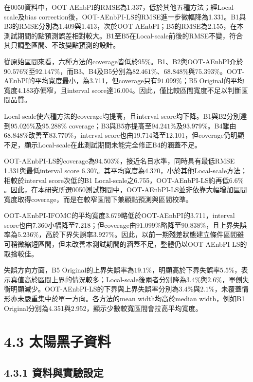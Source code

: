 在0050資料中，OOT-AEnbPI的RMSE為1.337，低於其他五種方法；經Local-scale及bias correction後，OOT-AEnbPI-LS的RMSE進一步微幅降為1.331。B1與B3的RMSE分別為1.409與1.413，次於OOT-AEnbPI；B5的RMSE為2.155，在本測試期間的點預測誤差相對較大。B1至B5在Local-scale前後的RMSE不變，符合其只調整區間、不改變點預測的設計。

從原始區間來看，六種方法的coverage皆低於95\%。B1、B2與OOT-AEnbPI介於$90.576\%$至$92.147\%$，而B3、B4及B5分別為$82.461\%$、$68.848\%$與$75.393\%$。OOT-AEnbPI的平均寬度最小，為3.711，但coverage只有$91.099\%$；B5 Original的平均寬度4.183亦偏窄，且interval score達16.004。因此，僅比較區間寬度不足以判斷區間品質。

Local-scale使六種方法的coverage均提高，且interval score均下降。B1與B2分別達到$95.026\%$及$95.288\%$ coverage；B3與B5亦提高至$94.241\%$及$93.979\%$。B4雖由$68.848\%$改善至$83.770\%$，interval score也由19.714降至12.101，但coverage仍明顯不足，顯示Local-scale在此測試期間未能完全修正B4的涵蓋不足。

OOT-AEnbPI-LS的coverage為$94.503\%$，接近名目水準，同時具有最低RMSE 1.331與最低interval score 6.307。其平均寬度為4.370，小於其他Local-scale方法；相較於interval score次低的B1 Local-scale之6.755，OOT-AEnbPI-LS約再低$6.6\%$。因此，在本研究所選0050測試期間中，OOT-AEnbPI-LS並非依靠大幅增加區間寬度取得coverage，而是在較窄區間下兼顧點預測與區間校準。

OOT-AEnbPI-IFOMC的平均寬度3.679略低於OOT-AEnbPI的3.711，interval score也由7.360小幅降至7.218；但coverage由$91.099\%$略降至$90.838\%$，且上界失誤率為$5.236\%$，高於下界失誤率$3.927\%$。因此，以前一期殘差狀態建立條件區間雖可稍微縮短區間，但未改善本測試期間的涵蓋不足，整體仍以OOT-AEnbPI-LS的取捨較佳。

失誤方向方面，B5 Original的上界失誤率為$19.1\%$，明顯高於下界失誤率$5.5\%$，表示真值高於區間上界的情況較多；Local-scale後兩者分別降為$3.4\%$與$2.6\%$，單側失衡明顯減少。OOT-AEnbPI-LS的下界與上界失誤率分別為$3.4\%$與$2.1\%$，未覆蓋情形亦未嚴重集中於單一方向。各方法的mean width均高於median width，例如B1 Original分別為4.351與2.952，顯示少數較寬區間會拉高平均寬度。

\section*{4.3 太陽黑子資料}

\subsection*{4.3.1 資料與實驗設定}

